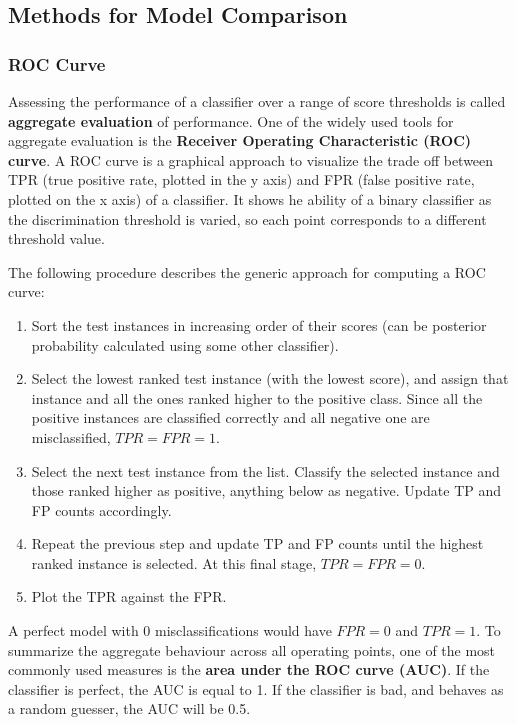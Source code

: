 \subsection{Methods for Model Comparison}

\subsubsection{ROC Curve}

Assessing the performance of a classifier over a range of score thresholds is called \textbf{aggregate evaluation} of performance. One of the widely used tools for aggregate evaluation is the \textbf{Receiver Operating Characteristic (ROC) curve}. A ROC curve is a graphical approach to visualize the trade off between TPR (true positive rate, plotted in the y axis) and FPR (false positive rate, plotted on the x axis) of a classifier. It shows he ability of a binary classifier as the discrimination threshold is varied, so each point corresponds to a different threshold value.

The following procedure describes the generic approach for computing a ROC curve:

\begin{enumerate}
    \item Sort the test instances in increasing order of their scores (can be posterior probability calculated using some other classifier).

    \item Select the lowest ranked test instance (with the lowest score), and assign that instance and all the ones ranked higher to the positive class. Since all the positive instances are classified correctly and all negative one are misclassified, $\textit{TPR} = \textit{FPR} = 1$.

    \item Select the next test instance from the list. Classify the selected instance and those ranked higher as positive, anything below as negative. Update TP and FP counts accordingly.

    \item Repeat the previous step and update TP and FP counts until the highest ranked instance is selected. At this final stage, $\textit{TPR} = \textit{FPR} = 0$.

    \item Plot the TPR against the FPR.
\end{enumerate}

A perfect model with 0 misclassifications would have $\textit{FPR} = 0$ and $\textit{TPR} = 1$. To summarize the aggregate behaviour across all operating points, one of the most commonly used measures is the \textbf{area under the ROC curve (AUC)}. If the classifier is perfect, the AUC is equal to 1. If the classifier is bad, and behaves as a random guesser, the AUC will be 0.5.

